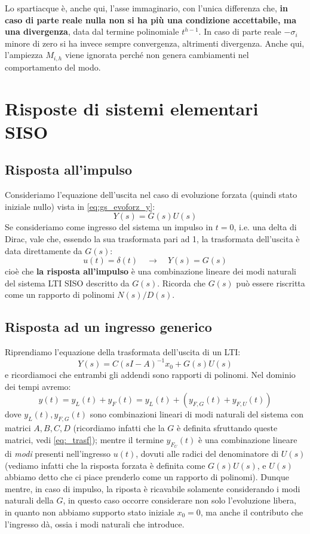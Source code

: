 Lo spartiacque è, anche qui, l'asse immaginario, con l'unica differenza che, \textbf{in caso di parte reale nulla non si ha più una condizione accettabile, ma una divergenza}, data dal termine polinomiale $t^{h-1}$. In caso di parte reale $-\sigma_i$ minore di zero si ha invece sempre convergenza, altrimenti divergenza. Anche qui, l'ampiezza $M_{i,h}$ viene ignorata perché non genera cambiamenti nel comportamento del modo.
\section{Risposte di sistemi elementari SISO}
\subsection{Risposta all'impulso}
Consideriamo l'equazione dell'uscita nel caso di evoluzione forzata (quindi stato iniziale nullo) vista in \eqref{eq:gs_evoforz_y}:
\begin{equation*}
Y(s) = G(s)U(s)
\end{equation*}
 Se consideriamo come ingresso del sistema un impulso in $t=0$, i.e. una delta di Dirac, vale che, essendo la sua trasformata pari ad 1, la trasformata dell'uscita è data direttamente da $G(s)$:
\begin{equation*}
u(t) = \delta(t) \quad \rightarrow \quad Y(s) = G(s) 
\end{equation*} 
cioè che \textbf{la risposta all'impulso} è una combinazione lineare dei modi naturali del sistema LTI SISO descritto da $G(s)$. Ricorda che $G(s)$ può essere riscritta come un rapporto di polinomi $N(s)/D(s)$.

\subsection{Risposta ad un ingresso generico}
Riprendiamo l'equazione della trasformata dell'uscita di un LTI:
\begin{equation*}
Y(s) = C(sI-A)^{-1}x_0 + G(s)U(s)
\end{equation*}
e ricordiamoci che entrambi gli addendi sono rapporti di polinomi. Nel dominio dei tempi avremo:
\begin{equation*}
y(t) = y_L(t) + y_F(t) = y_L(t) + (y_{F,G}(t) + y_{F,U}(t))
\end{equation*}
dove $y_L(t), y_{F,G}(t)$ sono combinazioni lineari di modi naturali del sistema con matrici $A,B,C,D$ (ricordiamo infatti che la $G$ è definita sfruttando queste matrici, vedi \eqref{eq:_trasf}); mentre  il termine $y_{F_U}(t)$ è una combinazione lineare di \textit{modi} presenti nell'ingresso $u(t)$, dovuti alle radici del denominatore di $U(s)$ (vediamo infatti che la risposta forzata è definita come $G(s)U(s)$, e $U(s)$ abbiamo detto che ci piace prenderlo come un rapporto di polinomi).
\starbreak
Dunque mentre, in caso di impulso, la riposta è ricavabile solamente considerando i modi naturali della $G$, in questo caso occorre considerare non solo l'evoluzione libera, in quanto non abbiamo supporto stato iniziale $x_0 = 0$, ma anche il contributo che l'ingresso dà, ossia i modi naturali che introduce.
